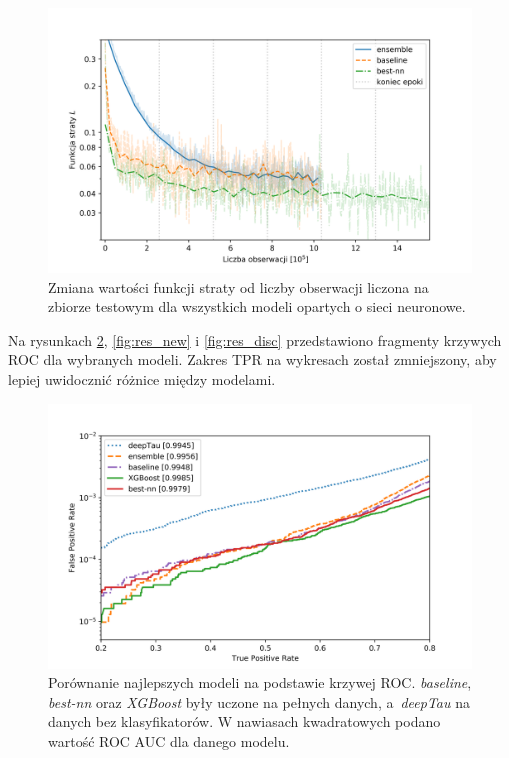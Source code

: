 \documentclass{pracalicmgr}
\begin{document}
	\begin{figure}
	\centering
	\includegraphics[width=1.\textwidth]{loss_all.png}
	\caption{Zmiana wartości funkcji straty od liczby obserwacji liczona na zbiorze testowym dla wszystkich modeli opartych o sieci neuronowe.}
	\label{fig:loss_all}
	\end{figure}	
	Na rysunkach \ref{fig:res_best}, \ref{fig:res_new} i \ref{fig:res_disc} przedstawiono fragmenty krzywych ROC dla wybranych modeli. Zakres TPR na wykresach został zmniejszony, aby lepiej uwidocznić różnice między modelami.
	
	\begin{figure}
	\centering
	\includegraphics[width=1\textwidth]{best_models.png}
	\caption{Porównanie najlepszych modeli na podstawie krzywej ROC.  \textit{baseline}, \textit{best-nn} oraz \textit{XGBoost} były uczone na pełnych danych, a~\textit{deepTau} na danych bez klasyfikatorów. W nawiasach kwadratowych podano wartość ROC AUC dla danego modelu.}
	\label{fig:res_best}	
	\end{figure}
	
\end{document}
